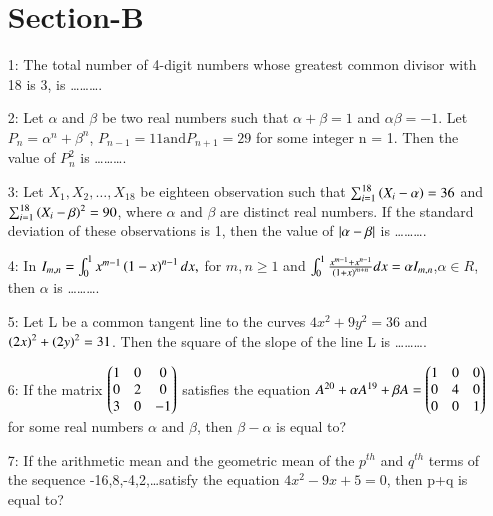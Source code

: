 \documentclass[journal,12pt,twocolumn]{IEEEtran}
\theoremstyle{remark}
\begin{document}
\begin{enumerate}
\section{Section-B}
\item[1:] The total number of 4-digit numbers whose greatest common divisor with 18 is 3, is \ldots\ldots\ldots.\vspace{0.5mm}\\
\item[2:] Let $\alpha$ and $\beta$ be two real numbers such that $\alpha + \beta = 1$ and $\alpha\beta = -1$. Let $P_n = \alpha^n + \beta^n$, $P_{n-1} = 11 \text{and} P_{n+1} = 29$ for some integer n = 1. Then the value of $P_n ^2$ is \ldots\ldots\ldots.\vspace{0.5mm}\\
\item[3:] Let $X_1,X_2,\ldots,X_{18}$ be eighteen observation such that $\sum_{i=1} ^{18} \left(X_i - \alpha\right) = 36$ and $\sum_{i=1} ^{18} \left(X_i - \beta\right)^2 = 90$, where $\alpha$ and $\beta$ are distinct real numbers. If the standard deviation of these observations is 1, then the value of $\left\vert\alpha - \beta\right\vert$ is \ldots\ldots\ldots.\vspace{0.5mm} \\ 
\item[4:] In $I_{m,n} = \int _0 ^1 x^{m-1}\left(1-x\right)^{n-1}dx,$ for $m,n\geq1$ and $\int _0 ^1\frac{x^{m-1} + x^{n-1}}{\left(1+x\right)^{m+n}}dx = \alpha I_{m,n}$,$\alpha \in R$, then $\alpha$ is \ldots\ldots\ldots. \vspace{0.5mm}\\
\item[5:] Let L be a common tangent line to the curves $4x^2 + 9y^2 = 36$ and $\left(2x\right)^2 + \left(2y\right)^2=31$. Then the square of the slope of the line L is \ldots\ldots\ldots.\vspace{0.5mm}\\
\item[6:] If the matrix $\begin{pmatrix}1&0&0\\0&2&0\\3&0&-1\end{pmatrix}$
satisfies the equation $A^{20} + \alpha A^{19} + \beta A = \begin{pmatrix}1&0&0\\0&4&0\\0&0&1\end{pmatrix}$ for some real numbers $\alpha$ and $\beta$, then $\beta - \alpha$ is equal to?\vspace{0.5mm}\\
\item[7:] If the arithmetic mean and the geometric mean of the $p^{th}$ and $q^{th}$ terms of the sequence -16,8,-4,2,\ldots satisfy the equation $4x^2-9x+5=0$, then p+q is equal to?\vspace{0.5mm}\\

\end{enumerate}
\end{document}
